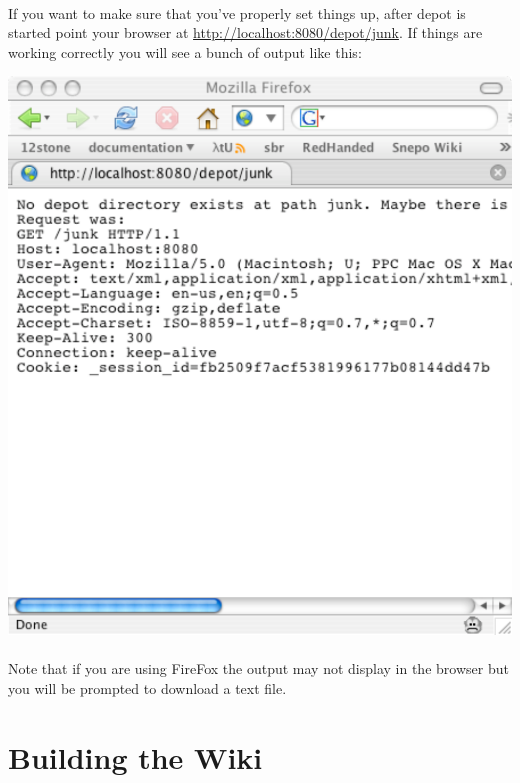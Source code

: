 \documentclass{report}
\begin{document}
\paragraph{}
If you want to make sure that you've properly set things up, after
depot is started point your browser at
\url{http://localhost:8080/depot/junk}. If things are working
correctly you will see a bunch of output like this:

\begin{center}
\includegraphics[scale=0.7]{wiki-tutorial-images/wiki-screenshot-404.pdf}
\end{center} 

\paragraph{}
Note that if you are using FireFox the output may not display in the
browser but you will be prompted to download a text file. 
\pagebreak

\section{Building the Wiki}
\end{document}
